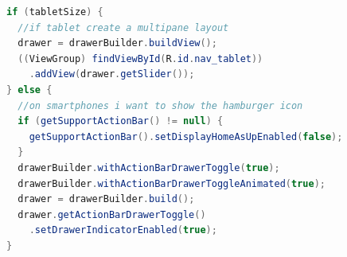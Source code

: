 \begin{lstlisting}[caption={Reuse Drawer for Multi-pane layout},label=lst:multipane, language=Java]
if (tabletSize) {
  //if tablet create a multipane layout
  drawer = drawerBuilder.buildView();
  ((ViewGroup) findViewById(R.id.nav_tablet))
    .addView(drawer.getSlider());
} else {
  //on smartphones i want to show the hamburger icon
  if (getSupportActionBar() != null) {
    getSupportActionBar().setDisplayHomeAsUpEnabled(false);
  }
  drawerBuilder.withActionBarDrawerToggle(true);
  drawerBuilder.withActionBarDrawerToggleAnimated(true);
  drawer = drawerBuilder.build();
  drawer.getActionBarDrawerToggle()
    .setDrawerIndicatorEnabled(true);
}
\end{lstlisting}


